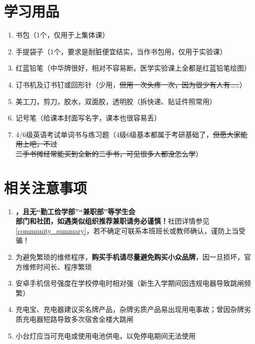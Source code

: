 \section[学习用品]{学习用品}
\begin{enumerate}
    \item 书包（1个，仅用于上集体课）
    \item 手提袋子（1个，要求是耐脏便宜结实，当作书包用，仅用于实验课\footnotemark）
    \item 红蓝铅笔（中华牌很好，相对不容易断。医学实验课上全都是红蓝铅笔绘图）
    \item 订书机及订书钉或回形针（少用，\sout{但用一次头疼一次，因为很少有人有……}）
    \item 美工刀，剪刀，胶水，双面胶，透明胶（拆快递、贴证件照常用）
    \item 记号笔（给课本封面写名字，课本也很容易丢）
    \item 4/6级英语考试单词书与练习题（4级6级基本都属于考研基础了，\sout{但愿大家能用上吧，不过\\二手书摊经常能买到全新的二手书，可见很多人都没怎么学}）
\end{enumerate}

\section[相关注意事项]{相关注意事项}
\begin{enumerate}
    \item \textbf{，且无“勤工俭学部”“兼职部”等学生会\\部门和社团，如遇类似组织推荐兼职请务必谨慎！}社团详情参见\uline{\ref{community_summary}}，若不确定可联系本班班长或教师确认，谨防上当受骗！
    \item 为避免繁琐的维修程序，\textbf{购买手机请尽量避免购买小众品牌}，因一旦损坏，官方维修时间长、程序繁琐
    \item 安卓手机信号强度在学校停电时相对强（新生入学期间因违规电器导致跳闸频繁）
    \item 充电宝、充电器建议买名牌产品，杂牌劣质产品易出现用电事故；曾因杂牌劣质充电器短路导致多次宿舍全楼大跳闸
    \item 小台灯应当可充电或使用电池供电，以免停电期间无法使用
\end{enumerate}